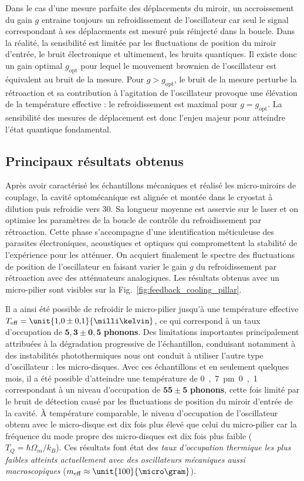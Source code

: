 \documentclass[12pt,a4paper]{article}
\begin{document}
Dans le cas d'une mesure parfaite des déplacements du miroir, un accroissement du gain $g$ entraine toujours un refroidissement de l'oscillateur car seul le signal correspondant à ses déplacements est mesuré puis réinjecté dans la boucle.
Dans la réalité, la sensibilité est limitée par les fluctuations de position du miroir d'entrée, le bruit électronique et ultimement, les bruits quantiques.
Il existe donc un gain optimal $g_\mathrm{opt}$ pour lequel le mouvement brownien de l'oscillateur est équivalent au bruit de la mesure.
Pour $g>g_\mathrm{opt}$, le bruit de la mesure perturbe la rétroaction et sa contribution à l'agitation de l'oscillateur provoque une élévation de la température effective : le refroidissement est maximal pour $g=g_\mathrm{opt}$.
La sensibilité des mesures de déplacement est donc l'enjeu majeur pour atteindre l'état quantique fondamental.

\subsection{Principaux résultats obtenus}
\label{sec:results}

Après avoir caractérisé les échantillons mécaniques et réalisé les micro-miroirs de couplage, la cavité optomécanique est alignée et montée dans le cryostat à dilution puis refroidie vers \unit{30}{\milli\kelvin}.
Sa longueur moyenne est asservie sur le laser et on optimise les paramètres de la boucle de contrôle du refroidissement par rétroaction.
Cette phase s'accompagne d'une identification méticuleuse des parasites électroniques, acoustiques et optiques qui compromettent la stabilité de l'expérience pour les atténuer.
On acquiert finalement le spectre des fluctuations de position de l'oscillateur en faisant varier le gain $g$ du refroidissement par rétroaction avec des atténuateurs analogiques.
Les résultats obtenus avec un micro-pilier sont visibles sur la Fig.~\ref{fig:feedback_cooling_pillar}.

Il a ainsi été possible de refroidir le micro-pilier jusqu'à une température effective $T_\mathrm{eff} = \unit{1{,}0\pm 0{,}1}{\milli\kelvin}$, ce qui correspond à un taux d'occupation de $\mathbf{5{,}3 \pm 0{,}5}$ \textbf{phonons}.
Des limitations importantes principalement attribuées à la dégradation progressive de l'échantillon, conduisant notamment à des instabilités photothermiques nous ont conduit à utiliser l'autre type d'oscillateur : les micro-disques.
Avec ces échantillons et en seulement quelques mois, il a été possible d'atteindre une température de \unit{0{,}7\pm 0{,}1}{\milli\kelvin} correspondant à un niveau d'occupation de $\mathbf{55\pm5}$ \textbf{phonons}, cette fois limité par le bruit de détection causé par les fluctuations de position du miroir d'entrée de la cavité.
À température comparable, le niveau d'occupation de l'oscillateur obtenu avec le micro-disque est dix fois plus élevé que celui du micro-pilier car la fréquence du mode propre des micro-disques est dix fois plus faible ($T_Q = \hbar\Omega_m/k_B$).
Ces résultats font état des \textit{taux d'occupation thermique les plus faibles atteints actuellement avec des oscillateurs mécaniques aussi macroscopiques} ($m_\mathrm{eff}\approx\unit{100}{\micro\gram}$). 
\end{document}
